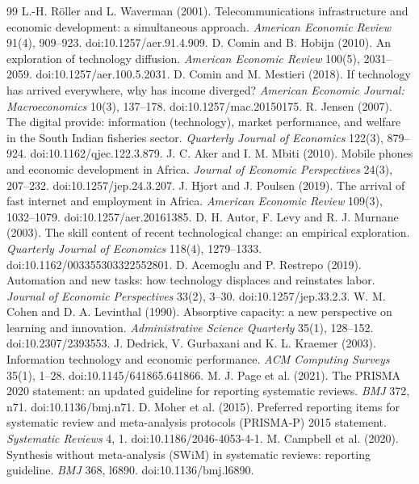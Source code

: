 \documentclass[11pt,a4paper]{article}
\begin{document}
\normalsize
\begin{thebibliography}{99}\small
{} L.-H. R\"oller and L. Waverman (2001). Telecommunications infrastructure and economic development: a simultaneous approach. \emph{American Economic Review} 91(4), 909--923. doi:10.1257/aer.91.4.909.
 D. Comin and B. Hobijn (2010). An exploration of technology diffusion. \emph{American Economic Review} 100(5), 2031--2059. doi:10.1257/aer.100.5.2031.
 D. Comin and M. Mestieri (2018). If technology has arrived everywhere, why has income diverged? \emph{American Economic Journal: Macroeconomics} 10(3), 137--178. doi:10.1257/mac.20150175.
 R. Jensen (2007). The digital provide: information (technology), market performance, and welfare in the South Indian fisheries sector. \emph{Quarterly Journal of Economics} 122(3), 879--924. doi:10.1162/qjec.122.3.879.
 J. C. Aker and I. M. Mbiti (2010). Mobile phones and economic development in Africa. \emph{Journal of Economic Perspectives} 24(3), 207--232. doi:10.1257/jep.24.3.207.
 J. Hjort and J. Poulsen (2019). The arrival of fast internet and employment in Africa. \emph{American Economic Review} 109(3), 1032--1079. doi:10.1257/aer.20161385.
 D. H. Autor, F. Levy and R. J. Murnane (2003). The skill content of recent technological change: an empirical exploration. \emph{Quarterly Journal of Economics} 118(4), 1279--1333. doi:10.1162/003355303322552801.
 D. Acemoglu and P. Restrepo (2019). Automation and new tasks: how technology displaces and reinstates labor. \emph{Journal of Economic Perspectives} 33(2), 3--30. doi:10.1257/jep.33.2.3.
 W. M. Cohen and D. A. Levinthal (1990). Absorptive capacity: a new perspective on learning and innovation. \emph{Administrative Science Quarterly} 35(1), 128--152. doi:10.2307/2393553.
 J. Dedrick, V. Gurbaxani and K. L. Kraemer (2003). Information technology and economic performance. \emph{ACM Computing Surveys} 35(1), 1--28. doi:10.1145/641865.641866.
 M. J. Page et al. (2021). The PRISMA 2020 statement: an updated guideline for reporting systematic reviews. \emph{BMJ} 372, n71. doi:10.1136/bmj.n71.
 D. Moher et al. (2015). Preferred reporting items for systematic review and meta-analysis protocols (PRISMA-P) 2015 statement. \emph{Systematic Reviews} 4, 1. doi:10.1186/2046-4053-4-1.
 M. Campbell et al. (2020). Synthesis without meta-analysis (SWiM) in systematic reviews: reporting guideline. \emph{BMJ} 368, l6890. doi:10.1136/bmj.l6890.

\end{thebibliography}
\end{document}
